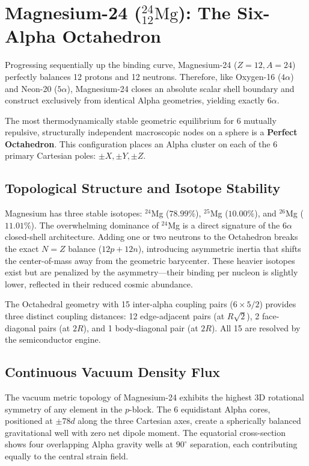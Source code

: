 \chapter{Magnesium-24 ($^{24}_{12}\text{Mg}$): The Six-Alpha Octahedron}
\label{ch:magnesium}

Progressing sequentially up the binding curve, Magnesium-24 ($Z=12, A=24$) perfectly balances 12 protons and 12 neutrons. Therefore, like Oxygen-16 ($4\alpha$) and Neon-20 ($5\alpha$), Magnesium-24 closes an absolute scalar shell boundary and construct exclusively from identical Alpha geometries, yielding exactly $6\alpha$.

The most thermodynamically stable geometric equilibrium for 6 mutually repulsive, structurally independent macroscopic nodes on a sphere is a \textbf{Perfect Octahedron}. This configuration places an Alpha cluster on each of the 6 primary Cartesian poles: $\pm X, \pm Y, \pm Z$.

\section{Topological Structure and Isotope Stability}
Magnesium has three stable isotopes: $^{24}$Mg ($78.99\%$), $^{25}$Mg ($10.00\%$), and $^{26}$Mg ($11.01\%$). The overwhelming dominance of $^{24}$Mg is a direct signature of the $6\alpha$ closed-shell architecture. Adding one or two neutrons to the Octahedron breaks the exact $N=Z$ balance ($12p + 12n$), introducing asymmetric inertia that shifts the center-of-mass away from the geometric barycenter. These heavier isotopes exist but are penalized by the asymmetry---their binding per nucleon is slightly lower, reflected in their reduced cosmic abundance.

The Octahedral geometry with 15 inter-alpha coupling pairs ($6 \times 5 / 2$) provides three distinct coupling distances: 12 edge-adjacent pairs (at $R\sqrt{2}$), 2 face-diagonal pairs (at $2R$), and 1 body-diagonal pair (at $2R$). All 15 are resolved by the semiconductor engine.

\section{Continuous Vacuum Density Flux}
The vacuum metric topology of Magnesium-24 exhibits the highest 3D rotational symmetry of any element in the $p$-block. The 6 equidistant Alpha cores, positioned at $\pm 78d$ along the three Cartesian axes, create a spherically balanced gravitational well with zero net dipole moment. The equatorial cross-section shows four overlapping Alpha gravity wells at $90^\circ$ separation, each contributing equally to the central strain field.

